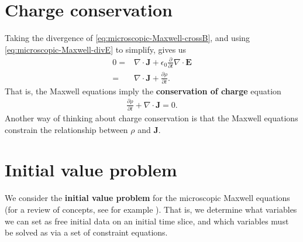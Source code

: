 \documentclass[12pt]{report}
\newcommand{\bE}{{\bm E}}
\newcommand{\bJ}{{\bm J}}
\begin{document}
\section{Charge conservation}

Taking the divergence of \eqref{eq:microscopic-Maxwell-crossB}, and using \eqref{eq:microscopic-Maxwell-divE} to simplify, gives us 
\begin{align}
    0
    =&
    \nabla\cdot\bJ
    +
    \epsilon_0\frac{\partial}{\partial t}\nabla\cdot \bE
    \nonumber \\
    =&
    \nabla\cdot\bJ
    +
    \frac{\partial\rho}{\partial t}
    .
\end{align}
That is, the Maxwell equations imply the \textbf{conservation of charge} equation
\begin{align}
    \label{eq:conservation-of-charge}
    \frac{\partial\rho}{\partial t}
    +
    \nabla\cdot\bJ
    =
    0
    .
\end{align}
Another way of thinking about charge conservation is that the Maxwell equations constrain the relationship between $\rho$ and $\bJ$. 

\section{Initial value problem}

We consider the \textbf{initial value problem} for the microscopic Maxwell equations (for a review of concepts, see for example \cite{kreiss1989initial}).
That is, we determine what variables we can set as free initial data on an initial time slice, and which variables must be solved as via a set of constraint equations. 
\end{document}
